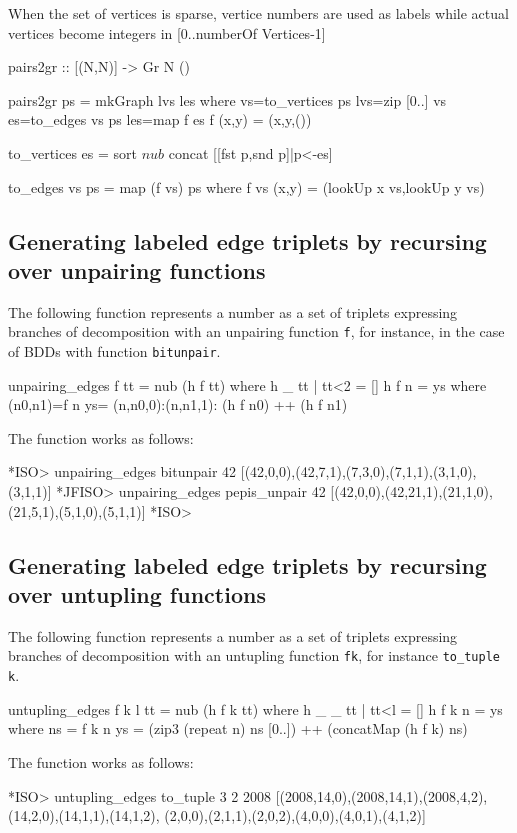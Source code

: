 \documentclass[]{INCLUDES/llncs}
\begin{document}
When the set of vertices is sparse, vertice numbers are used as labels while
actual vertices become integers in [0..numberOf Vertices-1]
\begin{code}
pairs2gr ::  [(N,N)] -> Gr N ()

pairs2gr ps = mkGraph lvs les where 
  vs=to_vertices ps
  lvs=zip [0..] vs
  es=to_edges vs ps
  les=map f es
  f (x,y) = (x,y,())

to_vertices es = sort $ nub $ concat [[fst p,snd p]|p<-es]

to_edges vs ps = map (f vs) ps where
  f vs (x,y) = (lookUp x vs,lookUp y vs)
\end{code}

\subsection*{Generating labeled edge triplets by recursing over unpairing
functions} 

The following function represents a number as a set of triplets expressing
branches of decomposition with an unpairing function {\tt f}, for
instance, in the case of BDDs with function {\tt bitunpair}.

\begin{code}
unpairing_edges f tt = nub  (h f tt) where
  h _ tt | tt<2 = []
  h f n  = ys where
     (n0,n1)=f n
     ys= (n,n0,0):(n,n1,1):
           (h f n0) ++ 
           (h f n1)
\end{code}
The function works as follows:
\begin{codex}
*ISO> unpairing_edges bitunpair 42
[(42,0,0),(42,7,1),(7,3,0),(7,1,1),(3,1,0),(3,1,1)]
*JFISO> unpairing_edges pepis_unpair 42
[(42,0,0),(42,21,1),(21,1,0),(21,5,1),(5,1,0),(5,1,1)]
*ISO> 
\end{codex}

\subsection*{Generating labeled edge triplets by recursing over untupling
functions} 

The following function represents a number as a set of triplets expressing
branches of decomposition with an untupling function {\tt fk}, for
instance {\tt to\_tuple k}.

\begin{code}
untupling_edges f k l tt = nub  (h f k tt) where
  h _ _ tt | tt<l = []
  h f k n  = ys where
     ns = f k n
     ys = (zip3 (repeat n) ns [0..]) ++
          (concatMap (h f k) ns) 
  
\end{code}
The function works as follows:
\begin{codex}
*ISO> untupling_edges to_tuple 3 2 2008
[(2008,14,0),(2008,14,1),(2008,4,2),(14,2,0),(14,1,1),(14,1,2),
 (2,0,0),(2,1,1),(2,0,2),(4,0,0),(4,0,1),(4,1,2)]
\end{codex}
\end{document}
